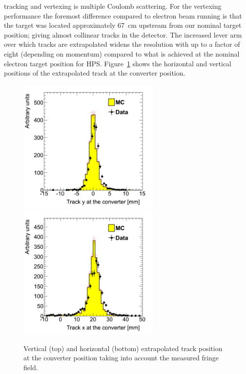 \documentclass[final,3p,times,twocolumn]{elsarticle}
\begin{document}
tracking and vertexing is multiple Coulomb scattering. For the vertexing performance the foremost 
difference compared to electron beam running is that the target was located approximately 67~cm 
upstream from our nominal target position; giving almost collinear tracks in the detector. The increased 
lever arm over which tracks are extrapolated widens the resolution with up to a factor of eight (depending 
on momentum) compared to what is achieved at the nominal electron target position for HPS. 
Figure~\ref{fig:impact_param} shows the horizontal and vertical positions of the extrapolated track at the 
converter position. 
{\small
	 \begin{figure}[]
 \begin{center}
	\includegraphics[width=7cm]{figures/h_trk_top_fr_conv_z_h_trk_top_conv_z_dataMC_twotrksel.png}
	\includegraphics[width=7cm]{figures/h_trk_top_fr_conv_y_h_trk_top_conv_y_dataMC_twotrksel.png}
	\caption{ Vertical (top) and horizontal (bottom) extrapolated track position at the converter position 
	taking into account the measured fringe field. }
	\label{fig:impact_param}
\end{center}
\end{figure}
}
\end{document}
